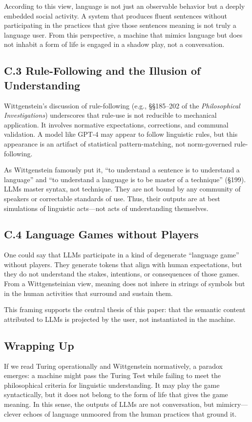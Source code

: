 According to this view, language is not just an observable behavior but a deeply embedded social activity. A system that produces fluent sentences without participating in the practices that give those sentences meaning is not truly a language user. From this perspective, a machine that mimics language but does not inhabit a form of life is engaged in a shadow play, not a conversation.

\subsection*{C.3 Rule-Following and the Illusion of Understanding}

Wittgenstein’s discussion of rule-following (e.g., §§185–202 of the \textit{Philosophical Investigations}) underscores that rule-use is not reducible to mechanical application. It involves normative expectations, corrections, and communal validation. A model like GPT-4 may appear to follow linguistic rules, but this appearance is an artifact of statistical pattern-matching, not norm-governed rule-following.

As Wittgenstein famously put it, ``to understand a sentence is to understand a language'' and ``to understand a language is to be master of a technique'' (§199). LLMs master syntax, not technique. They are not bound by any community of speakers or correctable standards of use. Thus, their outputs are at best simulations of linguistic acts—not acts of understanding themselves.

\subsection*{C.4 Language Games without Players}

One could say that LLMs participate in a kind of degenerate “language game” without players. They generate tokens that align with human expectations, but they do not understand the stakes, intentions, or consequences of those games. From a Wittgensteinian view, meaning does not inhere in strings of symbols but in the human activities that surround and sustain them.

This framing supports the central thesis of this paper: that the semantic content attributed to LLMs is projected by the user, not instantiated in the machine.

\subsection*{Wrapping Up}

If we read Turing operationally and Wittgenstein normatively, a paradox emerges: a machine might pass the Turing Test while failing to meet the philosophical criteria for linguistic understanding. It may play the game syntactically, but it does not belong to the form of life that gives the game meaning. In this sense, the outputs of LLMs are not conversation, but mimicry—clever echoes of language unmoored from the human practices that ground it.



